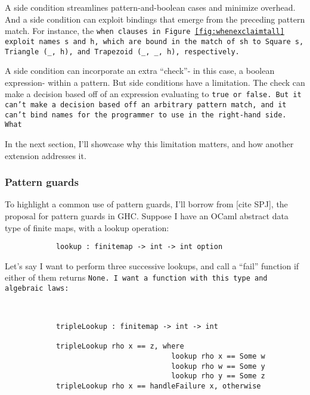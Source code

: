 \documentclass[manuscript,screen,review, 12pt, nonacm]{acmart}
\begin{document}
\begin{outline}[enumerate]
    
    A side condition streamlines pattern-and-boolean cases and minimize
    overhead. And a side condition can exploit bindings that emerge from the
    preceding pattern match. For instance, the \tt{when} clauses in
    Figure~\ref{fig:whenexclaimtall} exploit names \tt{s} and \tt{h}, which are
    bound in the match of \tt{sh} to \tt{Square s}, \tt{Triangle (\_, h)}, and
    \tt{Trapezoid (\_, \_, h)}, respectively. 

    A side condition can incorporate an extra “check”- in this case, a boolean
    expression- within a pattern. But side conditions have a limitation. The
    check can make a decision based off of an expression evaluating to \tt{true}
    or \tt{false}. But it can't make a decision based off an arbitrary pattern
    match, and it can't bind names for the programmer to use in the right-hand
    side. What 
    
    In the next section, I'll showcase why this limitation matters, and how
    another extension addresses it. 

    \subsubsection{Pattern guards}
    \label{guards}

    To highlight a common use of pattern guards, I'll borrow from [cite SPJ],
    the proposal for pattern guards in GHC. Suppose I have an OCaml abstract
    data type of finite maps, with a lookup operation: 

    \begin{minipage}[t]{\textwidth}
        \centering 
        \begin{verbatim}
            lookup : finitemap -> int -> int option
        \end{verbatim}
    \end{minipage}
    
    Let's say I want to perform three successive lookups, and call a “fail”
    function if either of them returns \tt{None}. I want a function with 
    this type and algebraic laws: 

    \begin{minipage}[t]{\textwidth}
        \centering 
        \begin{verbatim}
          

            tripleLookup : finitemap -> int -> int

            tripleLookup rho x == z, where 
                                       lookup rho x == Some w
                                       lookup rho w == Some y
                                       lookup rho y == Some z
            tripleLookup rho x == handleFailure x, otherwise
            

\end{verbatim}
\end{minipage}
\end{outline}
\end{document}
